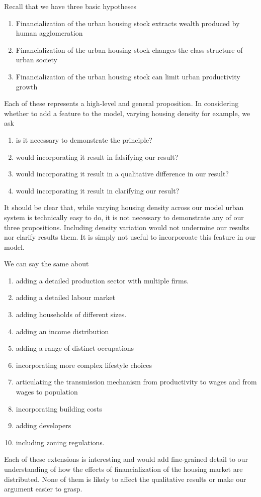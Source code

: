Recall that we have three basic hypotheses
\begin{enumerate}
    \item Financialization of the urban housing stock extracts wealth produced by human agglomeration 
    \item Financialization of the urban housing stock changes the class structure of urban society
    \item Financialization of the urban housing stock can limit urban productivity growth
\end{enumerate}
Each  of these represents a high-level and general proposition. In considering whether to add a feature to the model, varying housing density for example, we ask 
\begin{enumerate}
    \item is it necessary to demonstrate the principle? 
    \item would incorporating it result in falsifying our result?
    \item would incorporating it result in a qualitative difference in our result?
    \item would incorporating it result in clarifying our result?
\end{enumerate}
It should be clear that, while varying housing density across our model urban system is technically easy to do, it is not necessary to demonstrate any of our three propositions. Including density variation would not undermine our results nor clarify results them. It is simply not useful to incorporoate this feature in our model. 

We can say the same about 
\begin{enumerate}
    \item adding a detailed production sector with multiple firms.
    \item adding a detailed labour market
    \item adding households of different sizes.
    \item adding an income distribution
    \item adding a range of distinct occupations
    \item incorporating more complex lifestyle choices
    \item articulating the transmission mechanism from productivity to wages and from wages to population
    \item incorporating building costs
    \item adding developers
    \item including zoning regulations. 
\end{enumerate}
Each of these extensions is interesting and would add fine-grained detail to our understanding of how the effects of financialization of the housing market are distributed. None of them is likely to affect the qualitative results or make  our argument easier to grasp.

